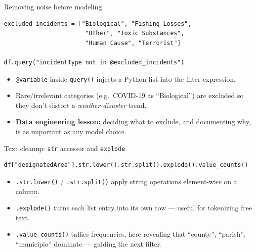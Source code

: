 \documentclass[11pt,aspectratio=43]{beamer}
\begin{document}
\begin{frame}[fragile]{Removing noise before modeling}
\begin{lstlisting}
excluded_incidents = ["Biological", "Fishing Losses",
                       "Other", "Toxic Substances",
                       "Human Cause", "Terrorist"]

df.query("incidentType not in @excluded_incidents")
\end{lstlisting}
\begin{itemize}
  \item \texttt{@variable} inside \texttt{query()} injects a Python list into the filter expression.
  \item Rare/irrelevant categories (e.g.\ COVID-19 as ``Biological'') are excluded so they don't distort a \emph{weather-disaster} trend.
  \item \textbf{Data engineering lesson:} deciding what to exclude, and documenting why, is as important as any model choice.
\end{itemize}
\end{frame}

\begin{frame}[fragile]{Text cleanup: \texttt{str} accessor and \texttt{explode}}
\begin{lstlisting}
df["designatedArea"].str.lower().str.split().explode().value_counts()
\end{lstlisting}
\begin{itemize}
  \item \texttt{.str.lower()} / \texttt{.str.split()} apply string operations element-wise on a column.
  \item \texttt{.explode()} turns each list entry into its own row --- useful for tokenizing free text.
  \item \texttt{.value\_counts()} tallies frequencies, here revealing that ``county'', ``parish'', ``municipio'' dominate --- guiding the next filter.
\end{itemize}
\end{frame}
\end{document}
